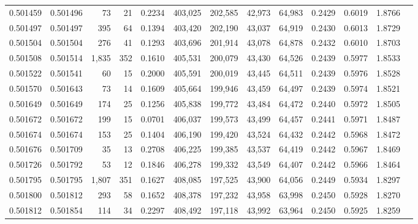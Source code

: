 \begin{tabular}{rrrrrrrrrrrrr}
0.501459 & 0.501496 &    73 &    21 &                                     0.2234 & 403,025 & 202,585 &  42,973 &  64,983 & 0.2429 & 0.6019 & 1.8766 \\
0.501497 & 0.501497 &   395 &    64 &                                     0.1394 & 403,420 & 202,190 &  43,037 &  64,919 & 0.2430 & 0.6013 & 1.8729 \\
0.501504 & 0.501504 &   276 &    41 &                                     0.1293 & 403,696 & 201,914 &  43,078 &  64,878 & 0.2432 & 0.6010 & 1.8703 \\
0.501508 & 0.501514 & 1,835 &   352 &                                     0.1610 & 405,531 & 200,079 &  43,430 &  64,526 & 0.2439 & 0.5977 & 1.8533 \\
0.501522 & 0.501541 &    60 &    15 &                                     0.2000 & 405,591 & 200,019 &  43,445 &  64,511 & 0.2439 & 0.5976 & 1.8528 \\
0.501570 & 0.501643 &    73 &    14 &                                     0.1609 & 405,664 & 199,946 &  43,459 &  64,497 & 0.2439 & 0.5974 & 1.8521 \\
0.501649 & 0.501649 &   174 &    25 &                                     0.1256 & 405,838 & 199,772 &  43,484 &  64,472 & 0.2440 & 0.5972 & 1.8505 \\
0.501672 & 0.501672 &   199 &    15 &                                     0.0701 & 406,037 & 199,573 &  43,499 &  64,457 & 0.2441 & 0.5971 & 1.8487 \\
0.501674 & 0.501674 &   153 &    25 &                                     0.1404 & 406,190 & 199,420 &  43,524 &  64,432 & 0.2442 & 0.5968 & 1.8472 \\
0.501676 & 0.501709 &    35 &    13 &                                     0.2708 & 406,225 & 199,385 &  43,537 &  64,419 & 0.2442 & 0.5967 & 1.8469 \\
0.501726 & 0.501792 &    53 &    12 &                                     0.1846 & 406,278 & 199,332 &  43,549 &  64,407 & 0.2442 & 0.5966 & 1.8464 \\
0.501795 & 0.501795 & 1,807 &   351 &                                     0.1627 & 408,085 & 197,525 &  43,900 &  64,056 & 0.2449 & 0.5934 & 1.8297 \\
0.501800 & 0.501812 &   293 &    58 &                                     0.1652 & 408,378 & 197,232 &  43,958 &  63,998 & 0.2450 & 0.5928 & 1.8270 \\
0.501812 & 0.501854 &   114 &    34 &                                     0.2297 & 408,492 & 197,118 &  43,992 &  63,964 & 0.2450 & 0.5925 & 1.8259 \\

\end{tabular}
